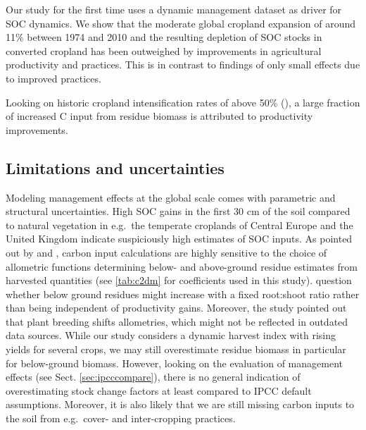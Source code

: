 \documentclass[gc, manuscript]{copernicus}
\begin{document}
Our study for the first time uses a dynamic management dataset as driver for SOC dynamics. We show that the moderate global cropland expansion of around 11\% between 1974 and 2010 and the resulting depletion of SOC stocks in converted cropland has been outweighed by improvements in agricultural productivity and practices. This is in contrast to \citep{pugh_simulated_2015} findings of only small effects due to improved practices.

Looking on historic cropland intensification rates of above 50\% (\citep{rudel_agricultural_2009}), a large fraction of increased C input from residue biomass is attributed to productivity improvements.

\hypertarget{limitations-and-uncertainties}{%
\subsection{Limitations and uncertainties}\label{limitations-and-uncertainties}}

Modeling management effects at the global scale comes with parametric and structural uncertainties. High SOC gains in the first 30 cm of the soil compared to natural vegetation in e.g.~the temperate croplands of Central Europe and the United Kingdom indicate suspiciously high estimates of SOC inputs. As pointed out by \citep{keel_large_2017} and \citep{smith_how_2020}, carbon input calculations are highly sensitive to the choice of allometric functions determining below- and above-ground residue estimates from harvested quantities (see \ref{tab:c2dm} for coefficients used in this study). \citep{keel_large_2017} question whether below ground residues might increase with a fixed root:shoot ratio rather than being independent of productivity gains. Moreover, the study pointed out that plant breeding shifts allometries, which might not be reflected in outdated data sources. While our study considers a dynamic harvest index with rising yields for several crops, we may still overestimate residue biomass in particular for below-ground biomass. However, looking on the evaluation of management effects (see Sect. \ref{sec:ipcccompare}), there is no general indication of overestimating stock change factors at least compared to IPCC default assumptions. Moreover, it is also likely that we are still missing carbon inputs to the soil from e.g.~cover- and inter-cropping practices.
\end{document}
